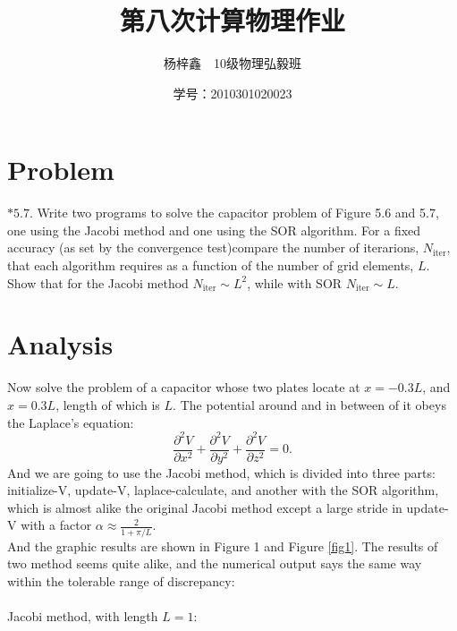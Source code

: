 \documentclass{article}
\author{杨梓鑫\ \ 10级物理弘毅班}
\title{第八次计算物理作业}
\date{学号：2010301020023}
\begin{document}
	\maketitle
\section{Problem}
$*\mathbf{5.7.}$ Write two programs to solve the capacitor problem of Figure 5.6 and 5.7, one using the Jacobi method and one using the SOR algorithm. For a fixed accuracy (as set by the convergence test)compare the number of iterarions, $N_{\mathrm{iter}}$, that  each algorithm requires as a function of the number of grid elements, $L$. Show that for the Jacobi method $N_{\mathrm{iter}} \sim L^2$, while with SOR $N_{\mathrm{iter}} \sim L$.

\section{Analysis}
Now solve the problem of a capacitor whose two plates locate at $x=-0.3L$, and $x=0.3L$, length of which is $L$. The potential around and in between of it obeys the Laplace's equation:
\begin{equation}
\frac{\partial^2 V}{\partial x^2}+\frac{\partial^2 V}{\partial y^2}+\frac{\partial^2 V}{\partial z^2}=0.
\end{equation}
And we are going to use the Jacobi method, which is divided into three parts: \sf \footnotesize initialize-V, update-V, laplace-calculate, \normalsize \rm and another with the SOR algorithm, which is almost alike the original Jacobi method except a large stride in \sf \footnotesize update-V \rm \normalsize with a factor $\alpha \approx \frac{2}{1+\pi/L}$. \\
And the graphic results are shown in Figure 1 and Figure \ref{fig1}. The results of two method seems quite alike, and the numerical output says the same way within the tolerable range of discrepancy: \\\\
\footnotesize{Jacobi method, with length } $L=1$:
\end{document}
